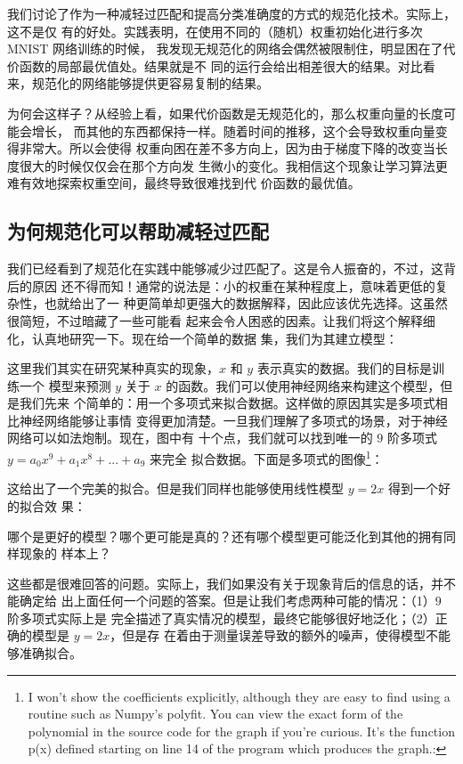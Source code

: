 我们讨论了作为一种减轻过匹配和提高分类准确度的方式的规范化技术。实际上，这不是仅
有的好处。实践表明，在使用不同的（随机）权重初始化进行多次 MNIST 网络训练的时候，
我发现无规范化的网络会偶然被限制住，明显困在了代价函数的局部最优值处。结果就是不
同的运行会给出相差很大的结果。对比看来，规范化的网络能够提供更容易复制的结果。

为何会这样子？从经验上看，如果代价函数是无规范化的，那么权重向量的长度可能会增长，
而其他的东西都保持一样。随着时间的推移，这个会导致权重向量变得非常大。所以会使得
权重向困在差不多方向上，因为由于梯度下降的改变当长度很大的时候仅仅会在那个方向发
生微小的变化。我相信这个现象让学习算法更难有效地探索权重空间，最终导致很难找到代
价函数的最优值。

\subsection{为何规范化可以帮助减轻过匹配}

我们已经看到了规范化在实践中能够减少过匹配了。这是令人振奋的，不过，这背后的原因
还不得而知！通常的说法是：小的权重在某种程度上，意味着更低的复杂性，也就给出了一
种更简单却更强大的数据解释，因此应该优先选择。这虽然很简短，不过暗藏了一些可能看
起来会令人困惑的因素。让我们将这个解释细化，认真地研究一下。现在给一个简单的数据
集，我们为其建立模型：

这里我们其实在研究某种真实的现象，$x$ 和 $y$ 表示真实的数据。我们的目标是训练一个
模型来预测 $y$ 关于 $x$ 的函数。我们可以使用神经网络来构建这个模型，但是我们先来
个简单的：用一个多项式来拟合数据。这样做的原因其实是多项式相比神经网络能够让事情
变得更加清楚。一旦我们理解了多项式的场景，对于神经网络可以如法炮制。现在，图中有
十个点，我们就可以找到唯一的 $9$ 阶多项式 $y=a_0x^9 + a_1x^8 + ... + a_9$ 来完全
拟合数据。下面是多项式的图像\footnote{I won't show the coefficients explicitly,
  although they are easy to find using a routine such as Numpy's polyfit. You
  can view the exact form of the polynomial in the source code for the graph if
  you're curious. It's the function p(x) defined starting on line 14 of the
  program which produces the graph.:

}：

这给出了一个完美的拟合。但是我们同样也能够使用线性模型 $y=2x$ 得到一个好的拟合效
果：

哪个是更好的模型？哪个更可能是真的？还有哪个模型更可能泛化到其他的拥有同样现象的
样本上？

这些都是很难回答的问题。实际上，我们如果没有关于现象背后的信息的话，并不能确定给
出上面任何一个问题的答案。但是让我们考虑两种可能的情况：（1）$9$ 阶多项式实际上是
完全描述了真实情况的模型，最终它能够很好地泛化；（2）正确的模型是 $y=2x$，但是存
在着由于测量误差导致的额外的噪声，使得模型不能够准确拟合。

